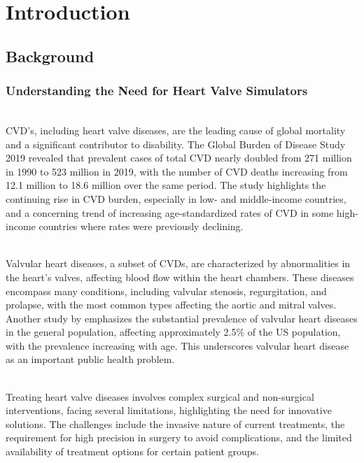 \chapter{Introduction}\label{chap:intro}

\section{Background}

\subsection{Understanding the Need for Heart Valve Simulators}
\\
\gls{CVD}'s, including heart valve diseases, are the leading cause of global mortality and a significant contributor to disability. The Global Burden of Disease Study 2019 revealed that prevalent cases of total \gls{CVD} nearly doubled from 271 million in 1990 to 523 million in 2019, with the number of \gls{CVD} deaths increasing from 12.1 million to 18.6 million over the same period. The study highlights the continuing rise in \gls{CVD} burden, especially in low- and middle-income countries, and a concerning trend of increasing age-standardized rates of \gls{CVD} in some high-income countries where rates were previously declining.

\\
Valvular heart diseases, a subset of \gls{CVD}s, are characterized by abnormalities in the heart's valves, affecting blood flow within the heart chambers. These diseases encompass many conditions, including valvular stenosis, regurgitation, and prolapse, with the most common types affecting the aortic and mitral valves.
Another study by  emphasizes the substantial prevalence of valvular heart diseases in the general population, affecting approximately 2.5\% of the US population, with the prevalence increasing with age. This underscores valvular heart disease as an important public health problem.

\\
Treating heart valve diseases involves complex surgical and non-surgical interventions, facing several limitations, highlighting the need for innovative solutions. The challenges include the invasive nature of current treatments, the requirement for high precision in surgery to avoid complications, and the limited availability of treatment options for certain patient groups. 

